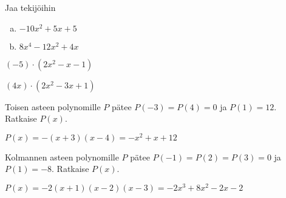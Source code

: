 \Harjoitustehtavat

\begin{tehtava}
    Jaa tekijöihin
    \begin{enumerate}[a)]
        \item $-10x^2+5x+5$
        \item $8x^4-12x^2+4x$
    \end{enumerate}
    \begin{vastaus}
        \item $(-5)\cdot(2x^2-x-1)$
        \item $(4x)\cdot(2x^2-3x+1)$
    \end{vastaus}
\end{tehtava}

\begin{tehtava}
    Toisen asteen polynomille $P$ pätee $P(-3)=P(4)=0$ ja $P(1)=12$. Ratkaise $P(x)$.
    \begin{vastaus}
        $P(x)=-(x+3)(x-4)=-x^2+x+12$
    \end{vastaus}
\end{tehtava}

\begin{tehtava}
    Kolmannen asteen polynomille $P$ pätee $P(-1)=P(2)=P(3)=0$ ja $P(1)=-8$. Ratkaise $P(x)$.
    \begin{vastaus}
        $P(x)=-2(x+1)(x-2)(x-3)=-2x^3+8x^2-2x-2$
    \end{vastaus}
\end{tehtava}
